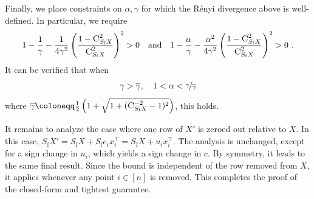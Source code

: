 \documentclass[11pt]{article}
\theoremstyle{definition}
\theoremstyle{plain}
\begin{document}
Finally, we place constraints on \(\alpha, \gamma\) for which the R\'{e}nyi divergence above is well-defined.
In particular, we require
\begin{equation*}
    1 - \frac{1}{\gamma} - \frac{1}{4\gamma^{2}}\left(\frac{1 - \textsc{C}^2_{S_{\mathrm{f}}X}}{\textsc{C}^2_{S_{\mathrm{f}}X}}\right)^{2} > 0 \quad\text{and}\quad 1 - \frac{\alpha}{\gamma} - \frac{\alpha^2}{4\gamma^2} \left(\frac{1 - \textsc{C}^2_{S_{\mathrm{f}}X}}{\textsc{C}^2_{S_{\mathrm{f}}X}}\right)^2 > 0~.
\end{equation*}
It can be verified that when
\begin{align}
    \gamma > \overline{\gamma}, \ \ \ 1 < \alpha < \nicefrac{\gamma}{\overline{\gamma}} 
\end{align}
where $\overline{\gamma} \coloneqq \frac{1}{2}\left(1 + \sqrt{1 + (\textsc{C}_{S_{\mathrm{f}}X}^{-2} - 1)^{2}}\right)$, this holds.

It remains to analyze the case where one row of $X'$ is zeroed out relative to $X$. In this case, $S_{\mathrm{f}}X' = S_{\mathrm{f}}X + S_{\mathrm{f}}e_i x_i^{\top} = S_{\mathrm{f}}X + u_i x_i^{\top}$. The analysis is unchanged, except for a sign change in $u_i$, which yields a sign change in $c$. By symmetry, it leads to the same final result. Since the bound is independent of the row removed from $X$, it applies whenever any point $i \in [n]$ is removed. This completes the proof of the closed-form and tightest guarantee. 

\end{document}
